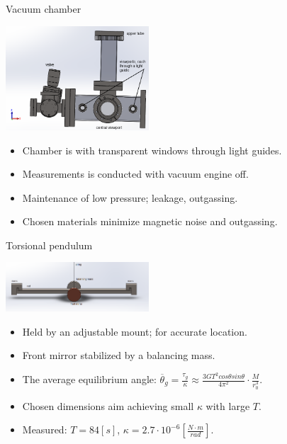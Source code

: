 \documentclass{beamer}
\begin{document}
\begin{frame}{Vacuum chamber}
	\begin{center}		
		\includegraphics[width=0.4\textwidth,keepaspectratio]{chamber_front_names.PNG}
	\end{center}
	\begin{itemize}
		\item Chamber is with transparent windows through light guides.
		\item Measurements is conducted with vacuum engine off.
		\item Maintenance of low pressure; leakage, outgassing.
		\item Chosen materials minimize magnetic noise and outgassing.

		
	\end{itemize}	
\end{frame}


\begin{frame}{Torsional pendulum}
	\begin{center}		
		\includegraphics[width=0.4\textwidth,keepaspectratio]{pendulum_front_names.png}
	\end{center}
	\begin{itemize}
		\item Held by an adjustable mount; for accurate location. 
		\item Front mirror stabilized by a balancing mass.
		\item The average equilibrium angle: $\overline{\theta}_g = \frac{\tau_g}{\kappa} \approx \frac{3GT^2cos\theta sin\theta}{4\pi^2 } \cdot \frac{M}{r_0^3}$.		
		\item Chosen dimensions aim achieving small $\kappa$ with large $T$.
		\item Measured: $T = 84[s]$, $\kappa = 2.7\cdot10^{-6}[\frac{N\cdot m}{rad}]$.
	\end{itemize}
	
\end{frame}
\end{document}
